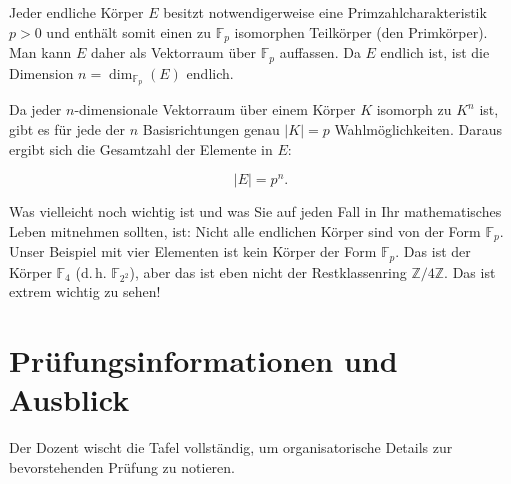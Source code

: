 \begin{math-stroke}
Jeder endliche Körper $E$ besitzt notwendigerweise eine Primzahlcharakteristik $p>0$ und enthält somit einen zu $\mathbb{F}_p$ isomorphen Teilkörper (den Primkörper). Man kann $E$ daher als Vektorraum über $\mathbb{F}_p$ auffassen. Da $E$ endlich ist, ist die Dimension $n = \dim_{\mathbb{F}_p}(E)$ endlich. 
\begin{explanation-of-steps}
Da jeder $n$-dimensionale Vektorraum über einem Körper $K$ isomorph zu $K^n$ ist, gibt es für jede der $n$ Basisrichtungen genau $|K| = p$ Wahlmöglichkeiten. Daraus ergibt sich die Gesamtzahl der Elemente in $E$:
\end{explanation-of-steps}
\[
|E| = p^n.
\]
\end{math-stroke}

\begin{spoken-clean}[01:11:09 - 01:12:58]
Was vielleicht noch wichtig ist und was Sie auf jeden Fall in Ihr mathematisches Leben mitnehmen sollten, ist: Nicht alle endlichen Körper sind von der Form $\mathbb{F}_p$. Unser Beispiel mit vier Elementen ist kein Körper der Form $\mathbb{F}_p$. Das ist der Körper $\mathbb{F}_4$ (d.\,h. $\mathbb{F}_{2^2}$), aber das ist eben nicht der Restklassenring $\mathbb{Z}/4\mathbb{Z}$. Das ist extrem wichtig zu sehen!
\end{spoken-clean}

\begin{math-stroke}
\end{math-stroke}

\section{Prüfungsinformationen und Ausblick}

\begin{meta-note}
Der Dozent wischt die Tafel vollständig, um organisatorische Details zur bevorstehenden Prüfung zu notieren.
\end{meta-note}

